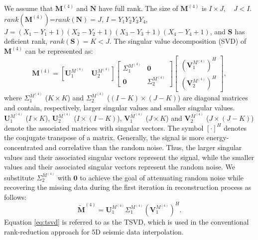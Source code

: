 We assume that $\mathbf{M}^{(4)}$ and $\mathbf{N}$ have full rank. The size of $\mathbf{M}^{(4)}$ is $I\times J,\quad J<I$. $rank(\mathbf{M}^{(4)})$=$rank(\mathbf{N})=J$, $I=Y_1 Y_2 Y_3 Y_4$, $J=(X_1-Y_1+1)(X_2-Y_2+1)(X_3-Y_3+1)(X_4-Y_4+1)$, and $\mathbf{S}$ has deficient rank, $rank(\mathbf{S})=K<J$. The singular value decomposition (SVD) of $\mathbf{M}^{(4)}$ can be represented as:
\begin{equation}
\label{eq:svdm}
\mathbf{M}^{(4)} = [\mathbf{U}_1^{M^{(4)}}\quad \mathbf{U}_2^{M^{(4)}}]\left[\begin{array}{cc}
\Sigma_1^{M^{(4)}} & \mathbf{0}\\
\mathbf{0} & \Sigma_2^{M^{(4)}}
\end{array}
\right]\left[\begin{array}{c}
(\mathbf{V}_1^{M^{(4)}})^H\\
(\mathbf{V}_2^{M^{(4)}})^H
\end{array}
\right],
\end{equation}
where $\Sigma_1^{M^{(4)}}$ ($K\times K$) and $\Sigma_2^{M^{(4)}}$ ($(I-K)\times(J-K)$) are diagonal matrices and contain, respectively, larger singular values and smaller singular values. $\mathbf{U}_1^{M^{(4)}}$ ($I\times K$), $\mathbf{U}_2^{M^{(4)}}$ ($I\times (I-K)$), $\mathbf{V}_1^{M^{(4)}}$ ($J\times K$) and $\mathbf{V}_2^{M^{(4)}}$ ($J\times (J-K)$) denote the associated matrices with singular vectors. The symbol $[\cdot]^H$ denotes the conjugate transpose of a matrix. Generally, the signal is more energy-concentrated and correlative than the random noise. Thus, the larger singular values and their associated singular vectors represent the signal, while the smaller values and their associated singular vectors represent the random noise. We substitute $\Sigma_2^{M^{(4)}}$ with $\mathbf{0}$ to achieve the goal of attenuating random noise while recovering the missing data during the first iteration in reconstruction process as follows:
\begin{equation}
\label{eq:tsvd}
\tilde{\mathbf{M}}^{(4)} = \mathbf{U}_1^{M^{(4)}}\Sigma_1^{M^{(4)}}(\mathbf{V}_1^{M^{(4)}})^H.
\end{equation}
Equation \ref{eq:tsvd} is referred to as the TSVD, which is used in the conventional rank-reduction approach for 5D seismic data interpolation.

